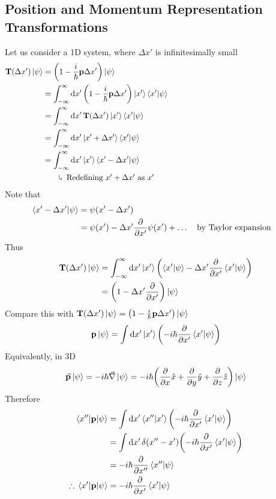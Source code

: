 \documentclass[12pt,a4paper,titlepage]{article}
\newcommand{\explain}[1]{%
	\quad\rotatebox[origin=c]{180}{\enskip$\Lsh$}\hfill
	\begin{minipage}[t]{\dimexpr\linewidth-8em\relax}
	#1
	\end{minipage}\hspace{4em}\bigskip
}
\begin{document}
\subsection{Position and Momentum Representation Transformations}
Let us consider a 1D system, where $\Delta x'$ is infinitesimally small
\begin{equation}
\begin{aligned}
\vb{T}(\Delta x')\ket{\psi}&=\qty(1-\frac{i}{\hbar}\vb{p}\Delta x')\ket{\psi}\\
&=\int_{-\infty}^{\infty}\dd{x'}\qty(1-\frac{i}{\hbar}\vb{p}\Delta x')\ket{x'}\ip{x'}{\psi}\\
&=\int_{-\infty}^{\infty}\dd{x'}\vb{T}(\Delta x')\ket{x'}\ip{x'}{\psi}\\
&=\int_{-\infty}^{\infty}\dd{x'}\ket{x'+\Delta x'}\ip{x'}{\psi}\\
&=\int_{-\infty}^{\infty}\dd{x'}\ket{x'}\ip{x'-\Delta x'}{\psi}\\
&\quad\explain{Redefining $x'+\Delta x'$ as $x'$}
\end{aligned}
\end{equation}
Note that
\begin{equation}
\begin{aligned}
\ip{x'-\Delta x'}{\psi}&=\psi(x'-\Delta x')\\
&=\psi(x')-\Delta x'\pdv{x'}\psi(x')+\ldots\qq{by Taylor expansion}
\end{aligned}
\end{equation}
Thus
\begin{equation}
\begin{aligned}
\vb{T}(\Delta x')\ket{\psi}&=\int_{-\infty}^{\infty}\dd{x'}\ket{x'}\qty(\ip{x'}{\psi}-\Delta x'\pdv{x'}\ip{x'}{\psi})\\
&=\qty(1-\Delta x'\pdv{x'})\ket{\psi}
\end{aligned}
\end{equation}
Compare this with $\vb{T}(\Delta x')\ket{\psi}=\qty(1-\frac{i}{\hbar}\vb{p}\Delta x')\ket{\psi}$
\begin{equation}
\vb{p}\ket{\psi}=\int\dd{x'}\ket{x'}\qty(-i\hbar\pdv{x'}\ip{x'}{\psi})
\end{equation}
Equivalently, in 3D
\begin{equation}
\vec{\vb{p}}\ket{\psi}=-i\hbar\vec{\nabla}\ket{\psi}=-i\hbar\qty(\pdv{x}\hat{x}+\pdv{y}\hat{y}+\pdv{z}\hat{z})\ket{\psi}
\end{equation}
Therefore
\begin{equation}
\begin{aligned}
\mel{x''}{\vb{p}}{\psi}&=\int\dd{x'}\ip{x''}{x'}\qty(-i\hbar\pdv{x'}\ip{x'}{\psi})\\
&=\int\dd{x'}\delta(x''-x')\qty(-i\hbar\pdv{x'}\ip{x'}{\psi})\\
&=-i\hbar\pdv{x''}\ip{x''}{\psi}\\
\therefore \mel{x'}{\vb{p}}{\psi}&=-i\hbar\pdv{x'}\ip{x'}{\psi}
\end{aligned}
\end{equation}
\end{document}
